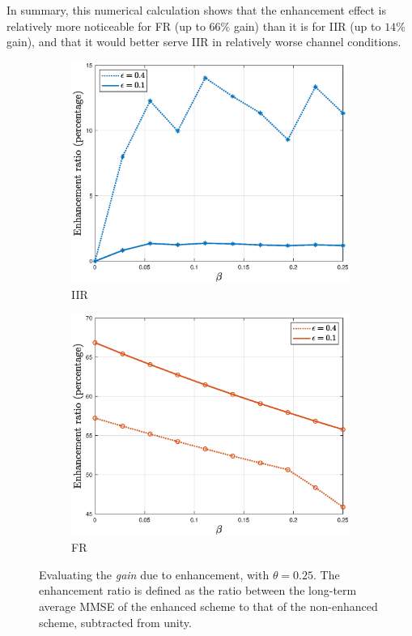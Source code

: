 \documentclass[12pt,journal,onecolumn]{IEEEtran}
\begin{document}
In summary, this numerical calculation shows that the enhancement effect is relatively more noticeable for FR (up to $66\%$ gain) than it is for IIR (up to $14\%$ gain), and that it would better serve IIR in relatively worse channel conditions.

\begin{figure}[t]
\begin{subfigure}{.5\textwidth}
\center
\includegraphics[scale=.4]{enhanced_vs_non_IIR_theta_25_eps_1_4}
\caption{IIR}
\label{fig_enhanced_vs_non_IIR_theta_25_eps_1_4}
\end{subfigure}
\begin{subfigure}{.5\textwidth}
\center
\includegraphics[scale=.4]{enhanced_vs_non_FR_theta_25_eps_1_4}
\caption{FR}
\label{fig_enhanced_vs_non_FR_theta_25_eps_1_4}
\end{subfigure}
\caption{Evaluating the {\it gain} due to enhancement, with $\theta=0.25$. The enhancement ratio is defined as the ratio between the long-term average MMSE of the enhanced scheme to that of the non-enhanced scheme, subtracted from unity.}
\label{fig_enhanced_vs_non_IIR_and_FR_theta_25_eps_1_4}
\end{figure}
\end{document}
